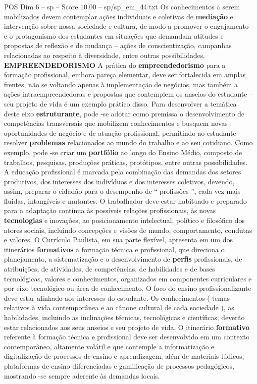\begin{textsample}{POS Dim 6 – sp – Score 10.00 – sp/sp\_em\_44.txt}
Os conhecimentos a serem mobilizados devem contemplar ações individuais e coletivas de \textbf{mediação} e intervenção sobre nossa sociedade e cultura, de modo a promover o engajamento e o protagonismo dos estudantes em situações que demandam atitudes e propostas de reflexão e de mudança – ações de conscientização, campanhas relacionadas ao respeito à diversidade, entre outras possibilidades. \textbf{EMPREENDEDORISMO} A prática do \textbf{empreendedorismo} para a formação profissional, embora pareça elementar, deve ser fortalecida em amplas frentes, não se voltando apenas à implementação de negócios, mas também a ações intraempreendedoras e propostas que contemplem os anseios do estudante – seu projeto de vida é um exemplo prático disso.
Para desenvolver a temática deste eixo \textbf{estruturante}, pode -se adotar como premissa o desenvolvimento de competências transversais que mobilizem conhecimentos e busquem novas oportunidades de negócio e de atuação profissional, permitindo ao estudante resolver \textbf{problemas} relacionados ao mundo do trabalho e ao seu cotidiano.
Como exemplo, pode -se criar um \textbf{portfólio} ao longo do Ensino Médio, composto de trabalhos, pesquisas, produções práticas, protótipos, entre outras possibilidades.
A educação profissional é marcada pela combinação das demandas dos setores produtivos, dos interesses dos indivíduos e dos interesses coletivos, devendo, assim, preparar o cidadão para o desempenho de “ profissões ”, cada vez mais fluidas, intangíveis e mutantes.
O trabalhador deve estar habituado e preparado para a adaptação contínua às possíveis relações profissionais, às novas \textbf{tecnologias} e inovações, ao posicionamento intelectual, político e filosófico dos atores sociais, incluindo concepções e visões de mundo, comportamento, condutas e valores.
O Currículo Paulista, em sua parte flexível, apresenta em um dos itinerários \textbf{formativos} a formação técnica e profissional, que direciona o planejamento, a sistematização e o desenvolvimento de \textbf{perfis} profissionais, de atribuições, de atividades, de competências, de habilidades e de bases tecnológicas, valores e conhecimentos, organizados em componentes curriculares e por eixo tecnológico ou área de conhecimento.
O foco do ensino profissionalizante deve estar alinhado aos interesses do estudante.
Os conhecimentos ( temas relativos à vida contemporânea e ao cânone cultural de cada sociedade ), as habilidades, incluindo as inclinações técnicas, tecnológicas e científicas, deverão estar relacionados aos seus anseios e seu projeto de vida.
O itinerário \textbf{formativo} referente à formação técnica e profissional deve ser desenvolvido em um contexto contemporâneo, altamente volátil e que contemple a informatização e digitalização de processos de ensino e aprendizagem, além de materiais lúdicos, plataformas de ensino diferenciadas e gamificação de processos pedagógicos, mostrando -se sempre aderente às demandas locais.

\end{textsample}
